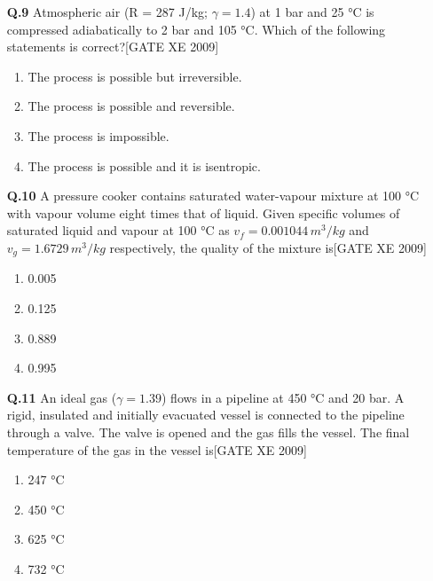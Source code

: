 \documentclass[journal,12pt,onecolumn]{IEEEtran}
\theoremstyle{remark}
\begin{document}
\begin{enumerate}
\item[\textbf{Q.9}] Atmospheric air (R = 287 J/kg; $\gamma = 1.4$) at 1 bar and 25 °C is compressed adiabatically to 2 bar and 105 °C. Which of the following statements is correct?\hfill[GATE XE 2009]
\begin{multicols}{2}
\begin{enumerate}
    \item The process is possible but irreversible.
    \item The process is possible and reversible.
    \item The process is impossible.
    \item The process is possible and it is isentropic.
\end{enumerate}
\end{multicols}

\vspace{0.3cm}

\item[\textbf{Q.10}]A pressure cooker contains saturated water-vapour mixture at 100 °C with vapour volume eight times that of liquid. Given specific volumes of saturated liquid and vapour at 100 °C as $v_f=0.001044\,m^3/kg$ and $v_g=1.6729\,m^3/kg$ respectively, the quality of the mixture is\hfill[GATE XE 2009]
\begin{multicols}{2}
\begin{enumerate}
    \item 0.005
    \item 0.125
    \item 0.889
    \item 0.995
\end{enumerate}
\end{multicols}

\vspace{0.3cm}

\item[\textbf{Q.11}] An ideal gas ($\gamma=1.39$) flows in a pipeline at 450 °C and 20 bar. A rigid, insulated and initially evacuated vessel is connected to the pipeline through a valve. The valve is opened and the gas fills the vessel. The final temperature of the gas in the vessel is\hfill[GATE XE 2009]
\begin{multicols}{2}
\begin{enumerate}
    \item 247 °C
    \item 450 °C
    \item 625 °C
    \item 732 °C
\end{enumerate}
\end{multicols}


\end{enumerate}
\end{document}
